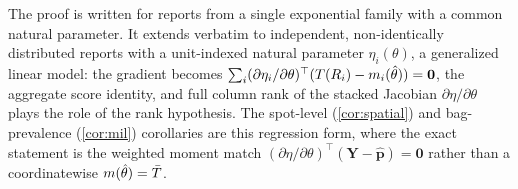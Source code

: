 \begin{remark}
\label{rem:glm}
The proof is written for reports from a single exponential family with a
common natural parameter. It extends verbatim to independent, non-identically
distributed reports with a unit-indexed natural parameter $\eta_i(\theta)$, a
generalized linear model: the gradient becomes $\sum_i
(\partial\eta_i/\partial\theta)^\top(T(R_i) - m_i(\hat\theta)) = \bm 0$, the
aggregate score identity, and full column rank of the stacked Jacobian
$\partial\eta/\partial\theta$ plays the role of the rank hypothesis. The
spot-level (\cref{cor:spatial}) and bag-prevalence (\cref{cor:mil}) corollaries
are this regression form, where the exact statement is the weighted moment match
$(\partial\eta/\partial\theta)^\top(\bm Y - \hat{\bm p}) = \bm 0$ rather than a
coordinatewise $m(\hat\theta) = \bar{T}$.
\end{remark}

